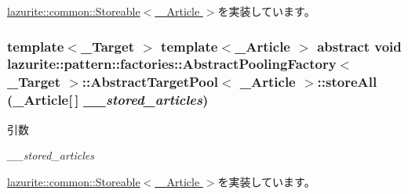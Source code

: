 \hyperlink{interfacelazurite_1_1common_1_1_storeable_3_01___article_01_4_ac97bf94535cb939fd12d123afe95fcd4}{lazurite::common::Storeable$<$ \_\-Article $>$}を実装しています。\hypertarget{classlazurite_1_1pattern_1_1factories_1_1_abstract_pooling_factory_3_01___target_01_4_1_1_abstra513b29652c04fa77de240c337e958a8d_a7b249c9e345439ad7e583aa71225e5fd}{
\subsubsection[{storeAll}]{\setlength{\rightskip}{0pt plus 5cm}template$<$\_\-Target $>$ template$<$\_\-Article $>$ abstract void lazurite::pattern::factories::AbstractPoolingFactory$<$ \_\-Target $>$::AbstractTargetPool$<$ \_\-Article $>$::storeAll (\_\-Article\mbox{[}$\,$\mbox{]} {\em \_\-\_\-stored\_\-articles})}}
\label{classlazurite_1_1pattern_1_1factories_1_1_abstract_pooling_factory_3_01___target_01_4_1_1_abstra513b29652c04fa77de240c337e958a8d_a7b249c9e345439ad7e583aa71225e5fd}

\begin{DoxyParams}{引数}
\item[{\em \_\-\_\-stored\_\-articles}]\end{DoxyParams}


\hyperlink{interfacelazurite_1_1common_1_1_storeable_3_01___article_01_4_ae96e27826bb2346355b9a2c226f80276}{lazurite::common::Storeable$<$ \_\-Article $>$}を実装しています。

